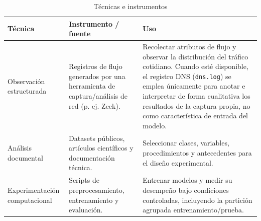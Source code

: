 \documentclass[conference]{IEEEtran}
\begin{document}
\begin{table}[!t]
\centering
\caption{Técnicas e instrumentos}
\label{tab:tecnicas}
\begin{tabular}{p{3.2cm}p{4.8cm}p{7.2cm}}
\toprule
\textbf{Técnica} & \textbf{Instrumento / fuente} & \textbf{Uso} \\
\midrule
Observación estructurada & Registros de flujo generados por una herramienta de captura/análisis de red (p. ej. Zeek). & Recolectar atributos de flujo y observar la distribución del tráfico cotidiano. Cuando esté disponible, el registro DNS (\texttt{dns.log}) se emplea únicamente para anotar e interpretar de forma cualitativa los resultados de la captura propia, no como característica de entrada del modelo. \\
Análisis documental & Datasets públicos, artículos científicos y documentación técnica. & Seleccionar clases, variables, procedimientos y antecedentes para el diseño experimental. \\
Experimentación computacional & Scripts de preprocesamiento, entrenamiento y evaluación. & Entrenar modelos y medir su desempeño bajo condiciones controladas, incluyendo la partición agrupada entrenamiento/prueba. \\
\bottomrule
\end{tabular}
\end{table}
\end{document}
